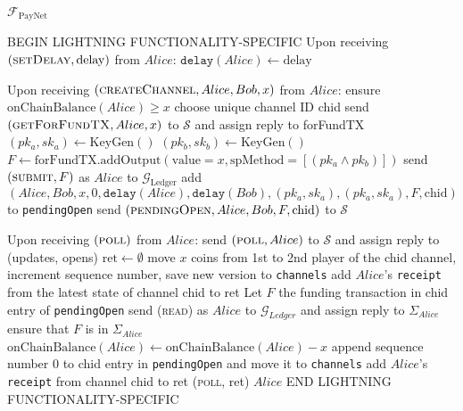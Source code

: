 \begin{functionality}{$\mathcal{F}_{\mathrm{PayNet}}$}
\begin{algorithmic}[1]
    \State BEGIN LIGHTNING FUNCTIONALITY-SPECIFIC
    \State Upon receiving $\left(\textsc{setDelay}, \mathrm{delay}\right)$
    from $Alice$:
    \Indent
      \State $\mathtt{delay}\left(Alice\right) \gets \mathrm{delay}$
    \EndIndent
    \State

    \State Upon receiving $\left(\textsc{createChannel}, Alice, Bob, x\right)$
    from $Alice$:
    \Indent
      \State ensure $\mathrm{onChainBalance}\left(Alice\right) \geq x$
      \State choose unique channel ID chid
      \State send $\left(\textsc{getForFundTX}, Alice, x\right)$ to
      $\mathcal{S}$ and assign reply to forFundTX
      \State $\left(pk_a, sk_a\right) \gets \mathrm{KeyGen}\left(\right)$
      \State $\left(pk_b, sk_b\right) \gets \mathrm{KeyGen}\left(\right)$
      \State $F \gets \mathrm{forFundTX}.\mathrm{addOutput}\left(\mathrm{value}
      = x, \mathrm{spMethod} = \left[\left(pk_a \wedge
      pk_b\right)\right]\right)$
      \State send $\left(\textsc{submit}, F\right)$ as $Alice$ to
      $\mathcal{G}_{\mathrm{Ledger}}$
      \State add $\left(Alice, Bob, x, 0, \mathtt{delay}\left(Alice\right),
      \mathtt{delay}\left(Bob\right), \left(pk_a, sk_a\right), \left(pk_a,
      sk_a\right), F, \mathrm{chid}\right)$ to \texttt{pendingOpen}
      \State send $\left(\textsc{pendingOpen}, Alice, Bob, F,
      \mathrm{chid}\right)$ to $\mathcal{S}$ 
    \EndIndent
    \State

    \State Upon receiving $\left(\textsc{poll}\right)$ from $Alice$:
    \Indent
      \State send $\left(\textsc{poll}, Alice\right)$ to $\mathcal{S}$ and
      assign reply to (updates, opens)
      \State $\mathrm{ret} \gets \emptyset$
          \State move $x$ coins from 1st to 2nd player of the chid channel,
          increment sequence number, save new version to \texttt{channels}
        \EndIf
        \State add $Alice$'s \texttt{receipt} from the latest state of channel
        chid to ret
      \EndFor
          \State Let $F$ the funding transaction in chid entry of
          \texttt{pendingOpen}
          \State send (\textsc{read}) as $Alice$ to $\mathcal{G}_{Ledger}$ and
          assign reply to $\Sigma_{Alice}$
          \State ensure that $F$ is in $\Sigma_{Alice}$
          \State $\mathrm{onChainBalance}\left(Alice\right) \gets
          \mathrm{onChainBalance}\left(Alice\right) - x$
          \State append sequence number 0 to chid entry in \texttt{pendingOpen}
          and move it to \texttt{channels}
        \EndIf
        \State add $Alice$'s \texttt{receipt} from channel chid to ret
      \EndFor
      \State \Return (\textsc{poll}, ret) $Alice$
    \EndIndent
    \State END LIGHTNING FUNCTIONALITY-SPECIFIC
    \State


\end{algorithmic}
\end{functionality}

